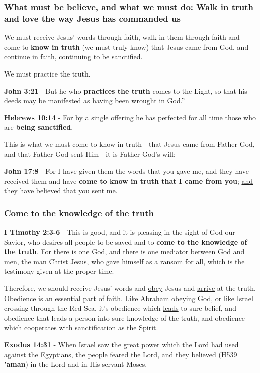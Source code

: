 \documentclass[11pt]{article}
\begin{document}
\subsubsection{What must be believe, and what we must do: Walk in \textbf{truth} and \textbf{love} the way Jesus has commanded us}
\label{sec:orgf7cd705}

We must receive Jesus' words through faith, walk in them through faith and come to \textbf{know in truth} (we must truly know) that Jesus came from God, and continue in faith, continuing to be sanctified.

We must practice the truth.

\textbf{John 3:21} - But he who \textbf{practices the truth} comes to the Light, so that his deeds may be manifested as having been wrought in God.”

\textbf{Hebrews 10:14} - For by a single offering he has perfected for all time those who are \textbf{being sanctified}.

This is what we must come to know in truth - that Jesus came from Father God, and that Father God sent Him - it is Father God's will:

\textbf{John 17:8} - For I have given them the words that you gave me, and they have received them and have \textbf{come to know in truth that I came from you}; \uline{and} they have believed that you sent me.

\subsubsection{Come to the \underline{knowledge} of the truth}
\label{sec:org973b753}

\textbf{I Timothy 2:3-6} - This is good, and it is pleasing in the sight of God our Savior, who desires all people to be saved and to \textbf{come to the knowledge of the truth}. For \uline{there is one God, and there is one mediator between God and men, the man Christ Jesus}, \uline{who gave himself as a ransom for all}, which is the testimony given at the proper time.

Therefore, we should receive Jesus' words and \uline{obey} Jesus and \uline{arrive} at the truth. Obedience is an essential part of faith. Like Abraham obeying God, or like Israel crossing through the Red Sea, it's obedience which \uline{leads} to sure belief, and obedience that leads a person into sure knowledge of the truth, and obedience which cooperates with sanctification as the Spirit.

\textbf{Exodus 14:31} - When Israel saw the great power which the Lord had used against the Egyptians, the people feared the Lord, and they believed (H539 \textbf{'aman}) in the Lord and in His servant Moses.
\end{document}
